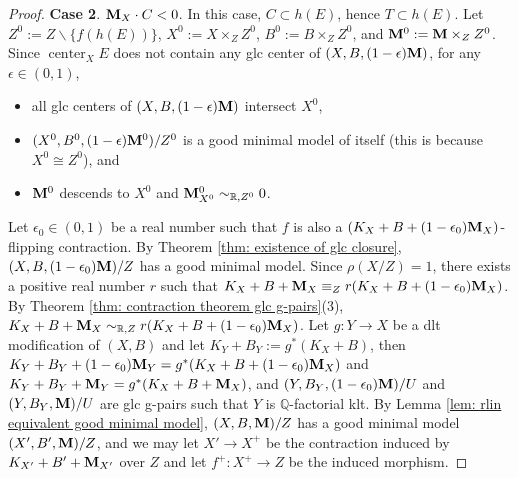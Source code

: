 \documentclass[11pt]{amsart}
\numberwithin{equation}{section}
\newcommand{\Mm}{{\bf{M}}}
\newcommand{\Qq}{\mathbb{Q}}
\newcommand{\Rr}{\mathbb{R}}
\newcommand{\Center}{\operatorname{center}}
\theoremstyle{definition}
\theoremstyle{definition}
\theoremstyle{definition}
\begin{document}
\begin{proof}
\noindent\textbf{Case 2}. $\Mm_X\cdot C<0$. In this case, $C\subset h(E)$, hence $T\subset h(E)$.  Let $Z^0:= Z\backslash\{f(h(E))\}$, $X^0:=X\times_ZZ^0$, $B^0:=B\times_ZZ^0$, and $\Mm^0:=\Mm\times_ZZ^0$. Since $\Center_XE$ does not contain any glc center of $(X,B,(1-\epsilon)\Mm)$, for any $\epsilon\in (0,1)$,
\begin{itemize}
\item all glc centers of $(X,B,(1-\epsilon)\Mm)$ intersect $X^0$,
\item $(X^0,B^0,(1-\epsilon)\Mm^0)/Z^0$ is a good minimal model of itself (this is because $X^0\cong Z^0$), and
\item $\Mm^0$ descends to $X^0$ and $\Mm^0_{X^0}\sim_{\Rr,Z^0}0$. 
\end{itemize}
Let $\epsilon_0\in (0,1)$ be a real number such that $f$ is also a $(K_X+B+(1-\epsilon_0)\Mm_X)$-flipping contraction. By Theorem \ref{thm: existence of glc closure}, $(X,B,(1-\epsilon_0)\Mm)/Z$ has a good minimal model. Since $\rho(X/Z)=1$, there exists a positive real number $r$ such that $K_X+B+\Mm_X\equiv_{Z}r(K_X+B+(1-\epsilon_0)\Mm_X)$. By Theorem \ref{thm: contraction theorem glc g-pairs}(3), $K_X+B+\Mm_X\sim_{\Rr,Z}r(K_X+B+(1-\epsilon_0)\Mm_X)$. Let $g: Y\rightarrow X$ be a dlt modification of $(X,B)$ and let $K_Y+B_Y:=g^*(K_X+B)$, then $K_Y+B_Y+(1-\epsilon_0)\Mm_Y=g^*(K_X+B+(1-\epsilon_0)\Mm_X)$ and $K_Y+B_Y+\Mm_Y=g^*(K_X+B+\Mm_X)$, and $(Y,B_Y,(1-\epsilon_0)\Mm)/U$ and $(Y,B_Y,\Mm)/U$ are glc g-pairs such that $Y$ is $\Qq$-factorial klt. By Lemma \ref{lem: rlin equivalent good minimal model}, $(X,B,\Mm)/Z$ has a good minimal model $(X',B',\Mm)/Z$, and we may let $X'\rightarrow X^+$ be the contraction induced by $K_{X'}+B'+\Mm_{X'}$ over $Z$ and let $f^+: X^+\rightarrow Z$ be the induced morphism.


\end{proof}
\end{document}
